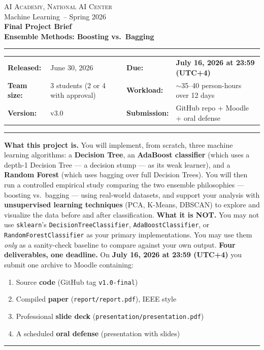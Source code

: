 \documentclass[11pt,a4paper]{article}
\newcommand{\coursename}{Machine Learning}
\newcommand{\institution}{AI Academy, National AI Center}
\newcommand{\semester}{Spring 2026}
\newcommand{\projecttitle}{Ensemble Methods: Boosting vs.\ Bagging}
\newcommand{\releasedate}{June 30, 2026}
\newcommand{\duedate}{July 16, 2026 at 23:59 (UTC+4)}
\newcommand{\version}{v3.0}
\begin{document}
\begin{center}
{\small \textsc{\institution} \\[0.2em] { \coursename\ -- \semester}}\\[1.2em]
{\Large\bfseries\color{accent} Final Project Brief}\\[0.3em]
{\LARGE\bfseries \projecttitle}\\[1em]
\rule{0.85\textwidth}{0.6pt}
\end{center}
\begin{tabularx}{\textwidth}{@{}lXlX@{}}
\textbf{Released:} & \releasedate & \textbf{Due:} & \textcolor{accent2}{\textbf{\duedate}} \\
\textbf{Team size:} & 3 students (2 or 4 with approval) & \textbf{Workload:} & $\sim$35--40 person-hours over 12 days \\
\textbf{Version:} & \version & \textbf{Submission:} & GitHub repo + Moodle + oral defense \\
\end{tabularx}
\vspace{0.4em}\hrule\vspace{0.6em}
\begin{infobox}[At a glance]
\textbf{What this project is.} You will implement, from scratch, three machine learning algorithms: a \textbf{Decision Tree}, an \textbf{AdaBoost classifier} (which uses a depth-1 Decision Tree --- a decision stump --- as its weak learner), and a \textbf{Random Forest} (which uses bagging over full Decision Trees). You will then run a controlled empirical study comparing the two ensemble philosophies --- boosting vs.\ bagging --- using real-world datasets, and support your analysis with \textbf{unsupervised learning techniques} (PCA, K-Means, DBSCAN) to explore and visualize the data before and after classification.
\smallskip
\textbf{What it is NOT.} You may not use \texttt{sklearn}'s \texttt{DecisionTreeClassifier}, \texttt{AdaBoostClassifier}, or \texttt{RandomForestClassifier} as your primary implementations. You may use them \emph{only} as a sanity-check baseline to compare against your own output.
\smallskip
\textbf{Four deliverables, one deadline.} On \textcolor{accent2}{\textbf{\duedate}} you submit one archive to Moodle containing:
\begin{enumerate}[topsep=2pt,itemsep=1pt,leftmargin=2.2em]
  \item Source \textbf{code} (GitHub tag \texttt{v1.0-final})
  \item Compiled \textbf{paper} (\texttt{report/report.pdf}), IEEE style
  \item Professional \textbf{slide deck} (\texttt{presentation/presentation.pdf})
  \item A scheduled \textbf{oral defense} (presentation with slides)
\end{enumerate}
\end{infobox}
\tableofcontents
\vspace{0.6em}\hrule\vspace{0.4em}
\end{document}
